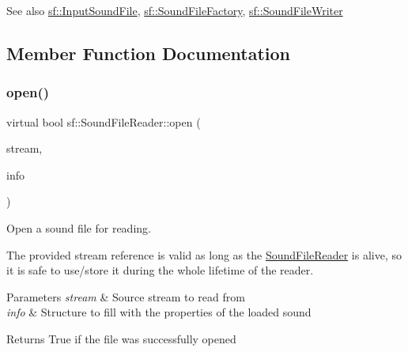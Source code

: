 \begin{DoxySeeAlso}{See also}
\hyperlink{classsf_1_1_input_sound_file}{sf\+::\+Input\+Sound\+File}, \hyperlink{classsf_1_1_sound_file_factory}{sf\+::\+Sound\+File\+Factory}, \hyperlink{classsf_1_1_sound_file_writer}{sf\+::\+Sound\+File\+Writer} 
\end{DoxySeeAlso}


\subsection{Member Function Documentation}
\mbox{\label{classsf_1_1_sound_file_reader_aa1d2fee2ba8f359c833ab74590d55935}} 
\subsubsection{\texorpdfstring{open()}{open()}}
{\footnotesize\ttfamily virtual bool sf\+::\+Sound\+File\+Reader\+::open (\begin{DoxyParamCaption}\item[{\hyperlink{classsf_1_1_input_stream}{Input\+Stream} \&}]{stream,  }\item[{\hyperlink{structsf_1_1_sound_file_reader_1_1_info}{Info} \&}]{info }\end{DoxyParamCaption})\hspace{0.3cm}{\ttfamily [pure virtual]}}



Open a sound file for reading. 

The provided stream reference is valid as long as the \hyperlink{classsf_1_1_sound_file_reader}{Sound\+File\+Reader} is alive, so it is safe to use/store it during the whole lifetime of the reader.


\begin{DoxyParams}{Parameters}
{\em stream} & Source stream to read from \\
\hline
{\em info} & Structure to fill with the properties of the loaded sound\\
\hline
\end{DoxyParams}
\begin{DoxyReturn}{Returns}
True if the file was successfully opened 
\end{DoxyReturn}
\mbox{\label{classsf_1_1_sound_file_reader_a3b7d86769ea07e24e7b0f0486bed7591}} 
